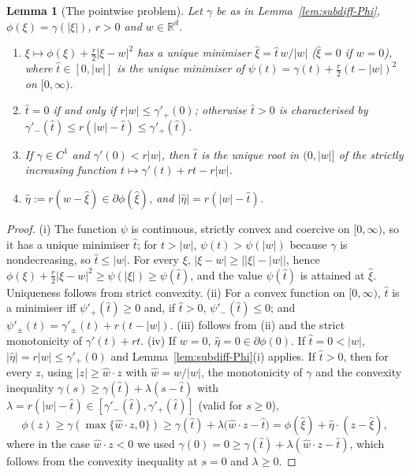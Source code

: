 \documentclass[11pt]{amsart}
\newtheorem{lemma}[theorem]{Lemma}
\theoremstyle{definition}
\theoremstyle{remark}
\numberwithin{equation}{section}
\newcommand{\R}{\mathbb{R}}
\newcommand{\abs}[1]{\lvert #1\rvert}
\begin{document}
\begin{lemma}[The pointwise problem]\label{lem:pointwise-prox}
Let $\gamma$ be as in Lemma~\ref{lem:subdiff-Phi}, $\phi(\xi)=\gamma(\abs\xi)$, $r>0$ and $w\in\R^d$.
\begin{enumerate}[label=\textup{(\roman*)}]
\item $\xi\mapsto\phi(\xi)+\frac r2\abs{\xi-w}^2$ has a unique minimiser $\hat\xi=\hat t\,w/\abs w$ \textup($\hat\xi=0$ if $w=0$\textup), where $\hat t\in[0,\abs w]$ is the unique minimiser of $\psi(t)=\gamma(t)+\frac r2(t-\abs w)^2$ on $[0,\infty)$.
\item $\hat t=0$ if and only if $r\abs w\le\gamma'_+(0)$; otherwise $\hat t>0$ is characterised by $\gamma'_-(\hat t)\le r(\abs w-\hat t)\le\gamma'_+(\hat t)$.
\item If $\gamma\in C^1$ and $\gamma'(0)<r\abs w$, then $\hat t$ is the unique root in $(0,\abs w]$ of the strictly increasing function $t\mapsto\gamma'(t)+rt-r\abs w$.
\item $\hat\eta:=r(w-\hat\xi)\in\partial\phi(\hat\xi)$, and $\abs{\hat\eta}=r(\abs w-\hat t)$.
\end{enumerate}
\end{lemma}
\begin{proof}
(i) The function $\psi$ is continuous, strictly convex and coercive on $[0,\infty)$, so it has a unique minimiser $\hat t$; for $t>\abs w$, $\psi(t)>\psi(\abs w)$ because $\gamma$ is nondecreasing, so $\hat t\le\abs w$. For every $\xi$, $\abs{\xi-w}\ge\big|\abs\xi-\abs w\big|$, hence $\phi(\xi)+\frac r2\abs{\xi-w}^2\ge\psi(\abs\xi)\ge\psi(\hat t)$, and the value $\psi(\hat t)$ is attained at $\hat\xi$. Uniqueness follows from strict convexity. (ii) For a convex function on $[0,\infty)$, $\hat t$ is a minimiser iff $\psi'_+(\hat t)\ge0$ and, if $\hat t>0$, $\psi'_-(\hat t)\le0$; and $\psi'_\pm(t)=\gamma'_\pm(t)+r(t-\abs w)$. (iii) follows from (ii) and the strict monotonicity of $\gamma'(t)+rt$. (iv) If $w=0$, $\hat\eta=0\in\partial\phi(0)$. If $\hat t=0<\abs w$, $\abs{\hat\eta}=r\abs w\le\gamma'_+(0)$ and Lemma~\ref{lem:subdiff-Phi}(i) applies. If $\hat t>0$, then for every $z$, using $\abs z\ge\hat w\cdot z$ with $\hat w=w/\abs w$, the monotonicity of $\gamma$ and the convexity inequality $\gamma(s)\ge\gamma(\hat t)+\lambda(s-\hat t)$ with $\lambda=r(\abs w-\hat t)\in[\gamma'_-(\hat t),\gamma'_+(\hat t)]$ (valid for $s\ge0$),
\[
\phi(z)\ge\gamma(\max\{\hat w\cdot z,0\})\ge\gamma(\hat t)+\lambda\big(\hat w\cdot z-\hat t\big)=\phi(\hat\xi)+\hat\eta\cdot(z-\hat\xi),
\]
where in the case $\hat w\cdot z<0$ we used $\gamma(0)=0\ge \gamma(\hat t)+\lambda(\hat w\cdot z-\hat t)$, which follows from the convexity inequality at $s=0$ and $\lambda\ge0$.
\end{proof}
\end{document}
